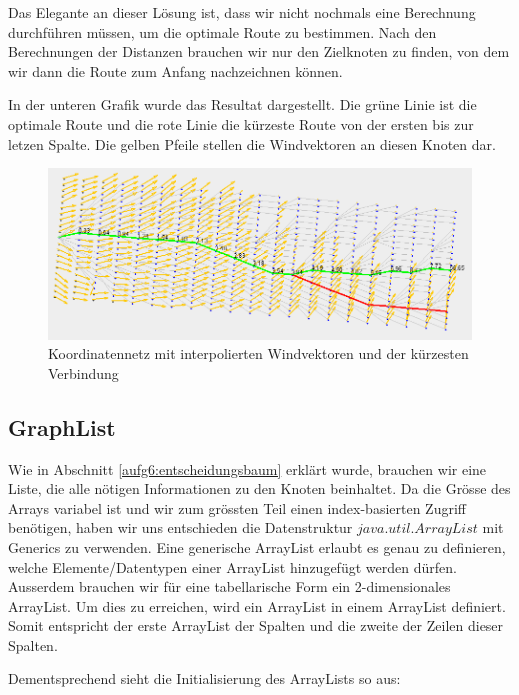 

Das Elegante an dieser Lösung ist, dass wir nicht nochmals eine Berechnung
durchführen müssen, um die optimale Route zu bestimmen. Nach den Berechnungen
der Distanzen brauchen wir nur den Zielknoten zu finden, von dem wir dann die
Route zum Anfang nachzeichnen können. 

In der unteren Grafik wurde das Resultat dargestellt. Die grüne Linie ist die
optimale Route und die rote Linie die kürzeste Route von der ersten bis zur
letzen Spalte. Die gelben Pfeile stellen die Windvektoren an diesen Knoten
dar.

\begin{figure}[h!]
\centering
\includegraphics[width=1\linewidth]{img/gridNet_result}
\caption{Koordinatennetz mit interpolierten Windvektoren und der kürzesten Verbindung}
\label{gridnetConn}
\end{figure}

\subsection{GraphList}
Wie in Abschnitt \ref{aufg6:entscheidungsbaum} erklärt wurde, brauchen wir
eine Liste, die alle nötigen Informationen zu den Knoten beinhaltet. Da die
Grösse des Arrays variabel ist und wir zum grössten Teil einen index-basierten
Zugriff benötigen, haben wir uns entschieden die Datenstruktur
$java.util.ArrayList$ mit Generics zu verwenden. Eine generische ArrayList
erlaubt es genau zu definieren, welche Elemente/Datentypen einer ArrayList
hinzugefügt werden dürfen. Ausserdem brauchen wir für eine tabellarische Form
ein 2-dimensionales ArrayList. Um dies zu erreichen, wird ein ArrayList in
einem ArrayList definiert. Somit entspricht der erste ArrayList der Spalten
und die zweite der Zeilen dieser Spalten.

Dementsprechend sieht die Initialisierung des ArrayLists so aus:

